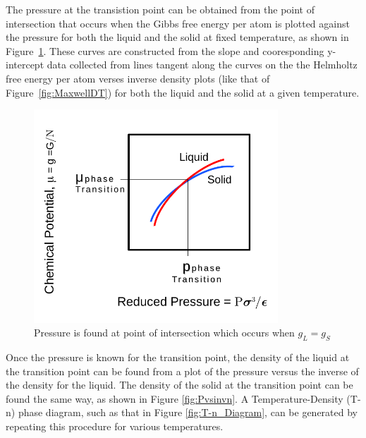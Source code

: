\documentclass[double,12pt]{beavtex}
\begin{document}
The pressure at the transistion point can be obtained from the point of 
intersection that occurs when the Gibbs free energy per atom is plotted 
against the pressure for both the liquid and the solid at fixed temperature, 
as shown in Figure~\ref{fig:GibbsvsP}. These curves are constructed from 
the slope and cooresponding y-intercept data collected from lines tangent 
along the curves on the the Helmholtz free energy per atom verses inverse 
density plots (like that of Figure~\ref{fig:MaxwellDT}) for both the 
liquid and the solid at a given temperature. 
\begin{figure}[h!]
    \centering
     \includegraphics[height=8cm]{figs/MaxwellDTC-Fig2.pdf}
    \caption{Pressure is found at point of intersection which occurs when $g_L=g_S$}
    \label{fig:GibbsvsP}
  \end{figure}

Once the pressure is known for the transition point, the density of the 
liquid at the transition point can be found from a plot of the pressure 
versus the inverse of the density for the liquid. The density of the solid 
at the transition point can be found the same way, as shown in Figure 
\ref{fig:Pvsinvn}. A Temperature-Density (T-n) phase diagram, such as 
that in Figure \ref{fig:T-n_Diagram}, can be generated by repeating this 
procedure for various temperatures. 
\end{document}
